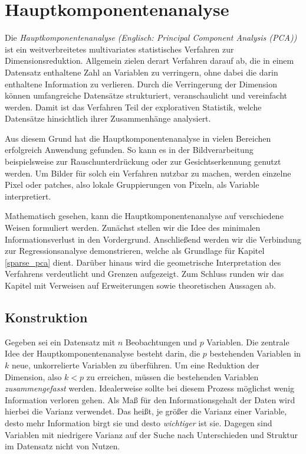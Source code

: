 \chapter{Hauptkomponentenanalyse}

\label{pca}

Die \textit{Hauptkomponentenanalyse (Englisch: Principal Component Analysis (PCA))} ist ein weitverbreitetes multivariates statistisches Verfahren zur Dimensionsreduktion. Allgemein zielen derart Verfahren darauf ab, die in einem Datensatz enthaltene Zahl an Variablen zu verringern, ohne dabei die darin enthaltene Information zu verlieren. Durch die Verringerung der Dimension können umfangreiche Datensätze strukturiert, veranschaulicht und vereinfacht werden. Damit ist das Verfahren Teil der explorativen Statistik, welche Datensätze hinsichtlich ihrer Zusammenhänge analysiert.

Aus diesem Grund hat die Hauptkomponentenanalyse in vielen Bereichen erfolgreich Anwendung gefunden. So kann es in der Bildverarbeitung beispielsweise zur Rauschunterdrückung \cite{babu} oder zur Gesichtserkennung \cite{jiang} genutzt werden. Um Bilder für solch ein Verfahren nutzbar zu machen, werden einzelne Pixel oder patches, also lokale Gruppierungen von Pixeln, als Variable interpretiert. 

Mathematisch gesehen, kann die Hauptkomponentenanalyse auf verschiedene Weisen formuliert werden. Zunächst stellen wir die Idee des minimalen Informationsverlust in den Vordergrund. Anschließend werden wir die Verbindung zur Regressionsanalyse demonstrieren, welche als Grundlage für Kapitel \ref{sparse_pca} dient. Darüber hinaus wird die geometrische Interpretation des Verfahrens verdeutlicht und Grenzen aufgezeigt. Zum Schluss runden wir das Kapitel mit Verweisen auf Erweiterungen sowie theoretischen Aussagen ab.




\section{Konstruktion}

Gegeben sei ein Datensatz mit $n$ Beobachtungen und $p$ Variablen. Die zentrale Idee der Hauptkomponentenanalyse besteht darin, die $p$ bestehenden Variablen in $k$ neue, unkorrelierte Variablen zu überführen. Um eine Reduktion der Dimension, also $k < p$ zu erreichen, müssen die bestehenden Variablen \textit{zusammengefasst} werden. Idealerweise sollte bei diesem Prozess möglichst wenig Information verloren gehen. Als Maß für den Informationsgehalt der Daten wird hierbei die Varianz verwendet. Das heißt, je größer die Varianz einer Variable, desto mehr Information birgt sie und desto \textit{wichtiger} ist sie. Dagegen sind Variablen mit niedrigere Varianz auf der Suche nach Unterschieden und Struktur im Datensatz nicht von Nutzen. 

